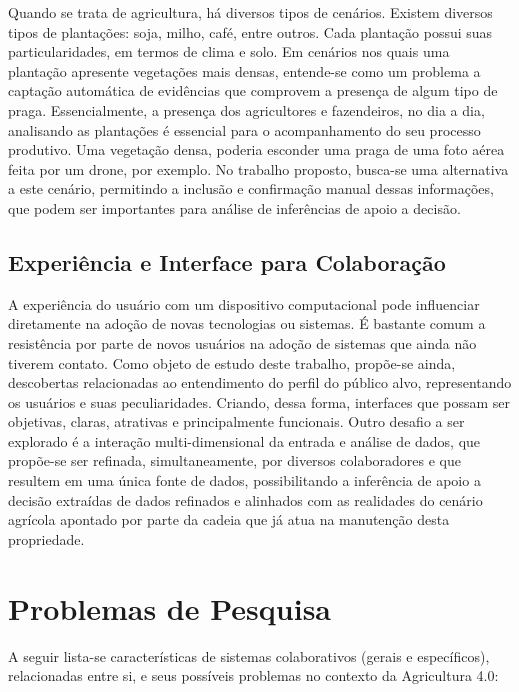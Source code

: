 \documentclass[12pt]{article}
\begin{document}
Quando se trata de agricultura, há diversos tipos de cenários. Existem diversos tipos de plantações: soja, milho, café, entre outros. Cada plantação possui suas particularidades, em termos de clima e solo. Em cenários nos quais uma plantação apresente vegetações mais densas, entende-se como um problema a captação automática de evidências que comprovem a presença de algum tipo de praga. Essencialmente, a presença dos agricultores e fazendeiros, no dia a dia, analisando as plantações é essencial para o acompanhamento do seu processo produtivo. Uma vegetação densa, poderia esconder uma praga de uma foto aérea feita por um drone, por exemplo. No trabalho proposto, busca-se uma alternativa a este cenário, permitindo a inclusão e confirmação manual dessas informações, que podem ser importantes para análise de inferências de apoio a decisão.

\subsection{Experiência e Interface para Colaboração}
\label{subsec:experiencia_interface_colaboracao}

A experiência do usuário com um dispositivo computacional pode influenciar diretamente na adoção de novas tecnologias ou sistemas. É bastante comum a resistência por parte de novos usuários na adoção de sistemas que ainda não tiverem contato. Como objeto de estudo deste trabalho, propõe-se ainda, descobertas relacionadas ao entendimento do perfil do público alvo, representando os usuários e suas peculiaridades. Criando, dessa forma, interfaces que possam ser objetivas, claras, atrativas e principalmente funcionais. Outro desafio a ser explorado é a interação multi-dimensional da entrada e análise de dados, que propõe-se ser refinada, simultaneamente, por diversos colaboradores e que resultem em uma única fonte de dados, possibilitando a inferência de apoio a decisão extraídas de dados refinados e alinhados com as realidades do cenário agrícola apontado por parte da cadeia que já atua na manutenção desta propriedade.

\section{Problemas de Pesquisa}
\label{subsec:problemas}

A seguir lista-se características de sistemas colaborativos (gerais e específicos), relacionadas entre si, e seus possíveis problemas no contexto da Agricultura 4.0:
\end{document}
